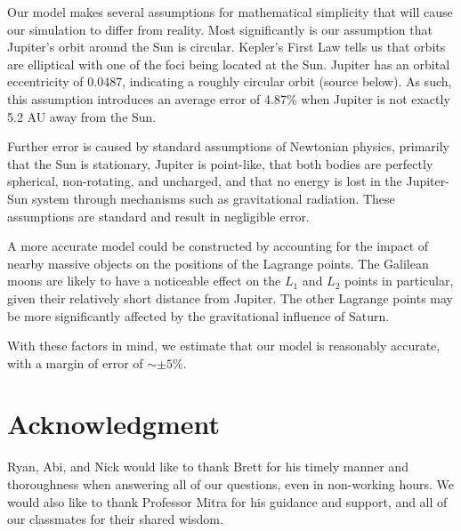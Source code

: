 \documentclass[linenumbers,RNAAS,trackchanges]{aastex631}
\begin{document}
Our model makes several assumptions for mathematical simplicity that will cause our simulation to differ from reality. Most significantly is our assumption that Jupiter's orbit around the Sun is circular. Kepler's First Law tells us that orbits are elliptical with one of the foci being located at the Sun. Jupiter has an orbital eccentricity of 0.0487, indicating a roughly circular orbit (source below). As such, this assumption introduces an average error of 4.87\%  when Jupiter is not exactly 5.2 AU away from the Sun. 

Further error is caused by standard assumptions of Newtonian physics, primarily that the Sun is stationary, Jupiter is point-like, that both bodies are perfectly spherical, non-rotating, and uncharged, and that no energy is lost in the Jupiter-Sun system through mechanisms such as gravitational radiation. These assumptions are standard and result in negligible error.

A more accurate model could be constructed by accounting for the impact of nearby massive objects on the positions of the Lagrange points. The Galilean moons are likely to have a noticeable effect on the $L_1$ and $L_2$ points in particular, given their relatively short distance from Jupiter. The other Lagrange points may be more significantly affected by the gravitational influence of Saturn. 

With these factors in mind, we estimate that our model is reasonably accurate, with a margin of error of $\sim\pm5\%$. 


\section{\textbf{Acknowledgment}} \label{sec:acknowledgment}
Ryan, Abi, and Nick would like to thank Brett for his timely manner and thoroughness when answering all of our questions, even in non-working hours. We would also like to thank Professor Mitra for his guidance and support, and all of our classmates for their shared wisdom. 

\newpage


\end{document}
